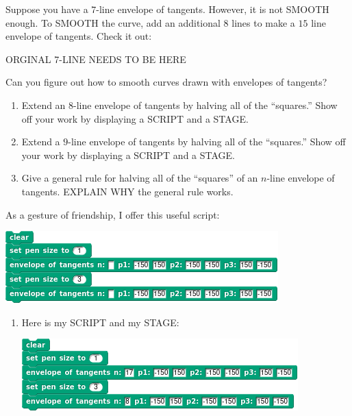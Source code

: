 \documentclass[noauthor,nooutcomes,hints,handout]{ximera}
\begin{document}
\begin{question}
  Suppose you have a $7$-line envelope of tangents. However, it is not
  SMOOTH enough. To SMOOTH the curve, add an additional $8$ lines to
  make a $15$ line envelope of tangents. Check it out:
  \begin{center}
  ORGINAL 7-LINE NEEDS TO BE HERE  
  \end{center}
  Can you figure out how to smooth curves drawn with envelopes of
  tangents?
  \begin{enumerate}
    \item Extend an $8$-line envelope of tangents by halving all of
      the ``squares.''  Show off your work by displaying a SCRIPT and
      a STAGE.
    \item Extend a $9$-line envelope of tangents by halving all of the
      ``squares.''  Show off your work by displaying a SCRIPT and a
      STAGE.
    \item Give a general rule for halving all of the ``squares'' of an
      $n$-line envelope of tangents. EXPLAIN WHY the general rule works.
  \end{enumerate}
  As a gesture of friendship, I offer this useful script:
  \begin{center}
    \includegraphics{genericExtendedEnvelopeOfTan.png}
  \end{center}
  \begin{freeResponse}
    \begin{enumerate}
    \item Here is my SCRIPT and my STAGE:
      \begin{center}
        \includegraphics[width=.3\textwidth]{8-17-lineOfTanScript.png}\qquad{}

\end{center}
\end{enumerate}
\end{freeResponse}
\end{question}
\end{document}
